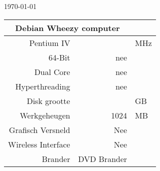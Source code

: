 \documentclass[a4paper,14pt]{extarticle}
\begin{document}
\centerline{\today}
\vskip 0.5cm
\begin{center}
\begin{tabular}{ |r| r| l| }
	\multicolumn{2}{c}{\Huge{Debian Wheezy computer}}\\
	\hline
	Pentium IV & \cpuspeed{} & MHz \\
	64-Bit & nee & \\
	Dual Core & nee & \\
	Hyperthreading & nee & \\
	Disk grootte & \disksize{} & GB \\
	Werkgeheugen & 1024 & MB \\
	Grafisch Versneld & Nee & \\
	Wireless Interface & Nee & \\
	Brander & DVD Brander & \\
\end{tabular}
\end{center}
\end{document}
